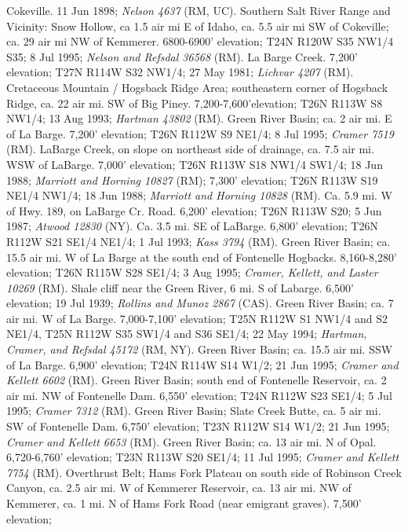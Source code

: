 Cokeville. 11 Jun 1898; \textit{Nelson 4637} (RM, UC).
Southern Salt River Range and Vicinity: Snow Hollow, ca 1.5 air mi E of Idaho,
ca. 5.5 air mi SW of Cokeville; ca. 29 air mi NW of Kemmerer.
6800-6900' elevation; T24N R120W S35 NW1/4 S35; 8 Jul 1995;
\textit{Nelson and Refsdal 36568} (RM).
La Barge Creek. 7,200' elevation; T27N R114W S32	NW1/4; 27 May 1981;
\textit{Lichvar 4207} (RM).
Cretaceous Mountain / Hogsback Ridge Area; southeastern corner of Hogsback
Ridge, ca. 22 air mi. SW of Big Piney. 7,200-7,600'elevation; T26N R113W S8
NW1/4; 13 Aug 1993; \textit{Hartman 43802} (RM).
Green River Basin; ca. 2 air mi. E of La Barge. 7,200' elevation;
T26N R112W S9 NE1/4; 8 Jul 1995; \textit{Cramer 7519} (RM).
LaBarge Creek, on slope on northeast side of drainage, ca. 7.5 air mi.
WSW of LaBarge. 7,000’ elevation; T26N R113W S18 NW1/4 SW1/4; 18 Jun 1988;
\textit{Marriott and Horning 10827} (RM);
7,300’ elevation; T26N R113W S19 NE1/4 NW1/4; 18 Jun 1988;
\textit{Marriott and Horning 10828} (RM).
Ca. 5.9 mi. W of Hwy. 189, on LaBarge Cr. Road. 6,200' elevation;
T26N R113W S20; 5 Jun 1987; \textit{Atwood 12830} (NY).
Ca. 3.5 mi. SE of LaBarge. 6,800' elevation; T26N R112W S21 SE1/4 NE1/4;
1 Jul 1993; \textit{Kass 3794} (RM).
Green River Basin; ca. 15.5 air mi. W of La Barge at the south end of
Fontenelle Hogbacks. 8,160-8,280' elevation; T26N R115W S28	SE1/4; 3 Aug 1995;
\textit{Cramer, Kellett, and Laster 10269} (RM).
Shale cliff near the Green River, 6 mi. S of Labarge. 6,500' elevation;
19 Jul 1939; \textit{Rollins and Munoz 2867} (CAS).
Green River Basin; ca. 7 air mi. W of La Barge. 7,000-7,100' elevation;
T25N R112W S1 NW1/4 and S2 NE1/4, T25N R112W S35 SW1/4 and S36 SE1/4;
22 May 1994; \textit{Hartman, Cramer, and Refsdal 45172} (RM, NY).
Green River Basin; ca. 15.5 air mi. SSW of La Barge. 6,900' elevation;
T24N R114W S14 W1/2; 21 Jun 1995; \textit{Cramer and Kellett 6602} (RM).
Green River Basin; south end of Fontenelle Reservoir, ca. 2 air mi. NW of
Fontenelle Dam. 6,550' elevation; T24N R112W S23 SE1/4; 5 Jul 1995;
\textit{Cramer 7312} (RM).
Green River Basin; Slate Creek Butte, ca. 5 air mi. SW of Fontenelle Dam.
6,750' elevation; T23N R112W S14 W1/2; 21 Jun 1995;
\textit{Cramer and Kellett 6653} (RM).
Green River Basin; ca. 13 air mi. N of Opal. 6,720-6,760' elevation;
T23N R113W S20 SE1/4; 11 Jul 1995; \textit{Cramer and Kellett 7754} (RM).
Overthrust Belt; Hams Fork Plateau on south side of Robinson Creek Canyon, ca.
2.5 air mi. W of Kemmerer Reservoir, ca. 13 air mi. NW of Kemmerer, ca. 1 mi. N
of Hams Fork Road (near emigrant graves). 7,500' elevation;
